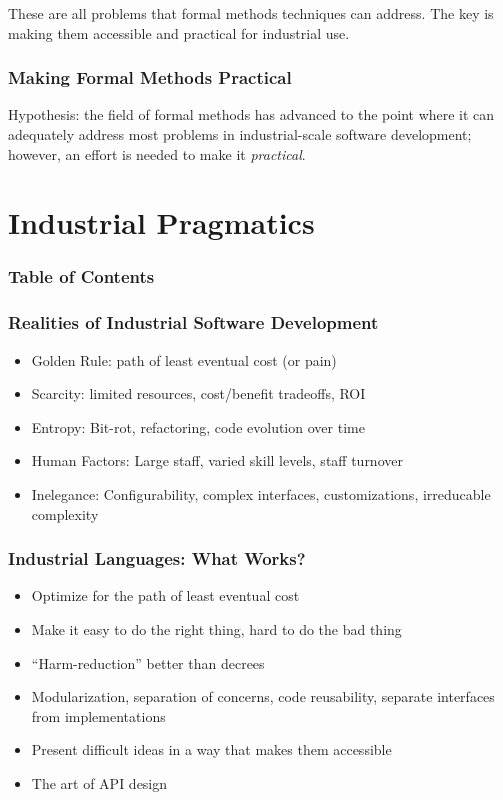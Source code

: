 \documentclass{beamer}
\begin{document}
\begin{frame}
  These are all problems that formal methods techniques can address.
  The key is making them accessible and practical for industrial use.
\end{frame}

\begin{frame}
  \frametitle{Making Formal Methods Practical}
  Hypothesis: the field of formal methods has advanced to the point
  where it can adequately address most problems in industrial-scale
  software development; however, an effort is needed to make it
  \emph{practical}.
\end{frame}

\section{Industrial Pragmatics}

\begin{frame}
  \frametitle{Table of Contents}
  \tableofcontents[currentsection]
\end{frame}

\begin{frame}
  \frametitle{Realities of Industrial Software Development}
  \begin{itemize}
    \item Golden Rule: path of least eventual cost (or pain)
    \item Scarcity: limited resources, cost/benefit tradeoffs, ROI
    \item Entropy: Bit-rot, refactoring, code evolution over time
    \item Human Factors: Large staff, varied skill levels, staff turnover
    \item Inelegance: Configurability, complex interfaces,
      customizations, irreducable complexity
  \end{itemize}
\end{frame}

\begin{frame}
  \frametitle{Industrial Languages: What Works?}
  \begin{itemize}
    \item Optimize for the path of least eventual cost
    \item Make it easy to do the right thing, hard to do the bad thing
    \item ``Harm-reduction'' better than decrees
    \item Modularization, separation of concerns, code reusability,
      separate interfaces from implementations
    \item Present difficult ideas in a way that makes them accessible
    \item The art of API design
  \end{itemize}
\end{frame}
\end{document}
